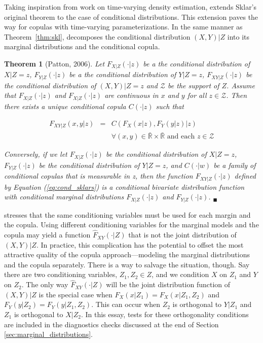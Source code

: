 \documentclass[12pt]{article}
\newtheorem{thm}{Theorem}
\begin{document}
Taking inspiration from \cite{Hansen_1994} work on time-varying density estimation, \cite{Patton_2006} extends Sklar's original theorem to the case of conditional distributions. This extension paves the way for copulas with time-varying parameterizations. In the same manner as Theorem~\ref{thm:skl}, \cite{Patton_2006} decomposes the conditional distribution $\left(X,Y\right) | Z$ into its marginal distributions and the conditional copula.


\begin{thm}[Patton, 2006] \label{thm:cond_skl}
	Let $F_{X|Z}(\cdot|z)$ be a the conditional distribution of $X|Z=z$, $F_{Y|Z}(\cdot|z)$ be a the conditional distribution of $Y|Z=z$, $F_{XY|Z}(\cdot|z)$ be the conditional distribution of $(X, Y)|Z = z$ and $\mathcal{Z}$ be the support of $Z$. Assume that $F_{X|Z}(\cdot|z)$ and $F_{X|Z}(\cdot|z)$ are continuous in $x$ and $y$ for all $z \in \mathcal{Z}$. Then there exists a unique conditional copula $C(\cdot|z)$ such that

	\begin{eqnarray}
		F_{XY|Z}\left(x,y|z\right) & = & C\left(F_{X}\left(x|z\right), F_{Y}\left(y|z\right)|z\right)  \label{eq:cond_sklars} \\
		 & &\forall(x, y) \in \bar{\mathbb{R}} \times \bar{\mathbb{R}} \text{ and each } z \in \mathcal{Z} \nonumber
	\end{eqnarray}

	Conversely, if we let $F_{X|Z}(\cdot|z)$ be the conditional distribution of $X|Z=z$, $F_{Y|Z}(\cdot|z)$ be the conditional distribution of $Y|Z=z$, and {$C(\cdot|w)$} be a family of conditional copulas that is measurable in z, then the function $F_{XY|Z}(\cdot|z)$ defined by Equation (\ref{eq:cond_sklars}) is a conditional bivariate distribution function with conditional marginal distributions $F_{X|Z}(\cdot|z)$ and $F_{Y|Z}(\cdot|z)$.  $_{\blacksquare}$
\end{thm}

\cite{Patton_2006} stresses that the same conditioning variables must be used for each margin and the copula. Using different conditioning variables for the marginal models and the copula may yield a function $\hat{F}_{XY}\left(\cdot|Z\right)$ that is not the joint distribution of $\left(X,Y\right)|Z$. In practice, this complication has the potential to offset the most attractive quality of the copula approach---modeling the marginal distributions and the copula separately. There is a way to salvage the situation, though. Say there are two conditioning variables, $Z_{1}, Z_{2} \in Z$, and we condition $X$ on $Z_{1}$ and $Y$ on $Z_{2}$. The only way $\hat{F}_{XY}\left(\cdot|Z\right)$ will be the joint distribution function of $\left(X,Y\right)|Z$ is the special case when $F_{X}\left(x|Z_{1}\right) = F_{X}\left(x|Z_{1},Z_{2}\right)$ and $F_{Y}\left(y|Z_{2}\right) = F_{Y}\left(y|Z_{1},Z_{2}\right)$. This can occur when $Z_{2}$ is orthogonal to $Y|Z_{1}$ and $Z_{1}$ is orthogonal to $X|Z_{2}$. In this essay, tests for these orthogonality conditions are included in the diagnostics checks discussed at the end of Section \ref{sec:marginal_distributions}.
\end{document}
